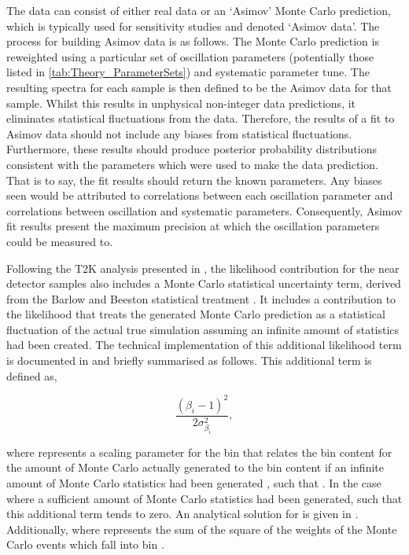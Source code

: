 The data can consist of either real data or an `Asimov' Monte Carlo prediction, which is typically used for sensitivity studies and denoted `Asimov data'. The process for building Asimov data is as follows. The Monte Carlo prediction is reweighted using a particular set of oscillation parameters (potentially those listed in \autoref{tab:Theory_ParameterSets}) and systematic parameter tune. The resulting spectra for each sample is then defined to be the Asimov data for that sample. Whilst this results in unphysical non-integer data predictions, it eliminates statistical fluctuations from the data. Therefore, the results of a fit to Asimov data should not include any biases from statistical fluctuations. Furthermore, these results should produce posterior probability distributions consistent with the parameters which were used to make the data prediction. That is to say, the fit results should return the known parameters. Any biases seen would be attributed to correlations between each oscillation parameter and correlations between oscillation and systematic parameters. Consequently, Asimov fit results present the maximum precision at which the oscillation parameters could be measured to.

Following the T2K analysis presented in \cite{Dunne2020-uf}, the likelihood contribution for the near detector samples also includes a Monte Carlo statistical uncertainty term, derived from the Barlow and Beeston statistical treatment \cite{Barlow1993-cc, Conway2011-go}. It includes a contribution to the likelihood that treats the generated Monte Carlo prediction as a statistical fluctuation of the actual true simulation assuming an infinite amount of statistics had been created. The technical implementation of this additional likelihood term is documented in \cite{t2k_tn_395} and briefly summarised as follows. This additional term is defined as,

\begin{equation}
  \frac{(\beta_{i}-1)^{2}}{2\sigma^{2}_{\beta_{i}}},
\end{equation}

where  represents a scaling parameter for the  bin that relates the bin content for the amount of Monte Carlo actually generated  to the bin content if an infinite amount of Monte Carlo statistics had been generated , such that . In the case where a sufficient amount of Monte Carlo statistics had been generated,  such that this additional term tends to zero. An analytical solution for  is given in \cite{t2k_tn_395}. Additionally,  where  represents the sum of the square of the weights of the Monte Carlo events which fall into bin .

